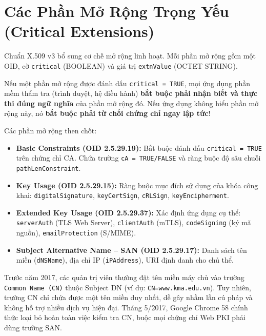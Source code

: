 \section{Các Phần Mở Rộng Trọng Yếu (Critical Extensions)}

Chuẩn X.509 v3 bổ sung cơ chế mở rộng linh hoạt. Mỗi phần mở rộng gồm một OID, cờ \texttt{critical} (BOOLEAN) và giá trị \texttt{extnValue} (OCTET STRING).

\begin{definition}
Nếu một phần mở rộng được đánh dấu \texttt{critical = TRUE}, mọi ứng dụng phần mềm thẩm tra (trình duyệt, hệ điều hành) \textbf{bắt buộc phải nhận biết và thực thi đúng ngữ nghĩa} của phần mở rộng đó. Nếu ứng dụng không hiểu phần mở rộng này, nó \textbf{bắt buộc phải từ chối chứng chỉ ngay lập tức}!
\Enddinhnghia
\end{definition}

Các phần mở rộng then chốt:
\begin{itemize}
  \item \textbf{Basic Constraints (OID 2.5.29.19):} Bắt buộc đánh dấu \texttt{critical = TRUE} trên chứng chỉ CA. Chứa trường \texttt{cA = TRUE/FALSE} và ràng buộc độ sâu chuỗi \texttt{pathLenConstraint}.
  \item \textbf{Key Usage (OID 2.5.29.15):} Ràng buộc mục đích sử dụng của khóa công khai: \texttt{digitalSignature}, \texttt{keyCertSign}, \texttt{cRLSign}, \texttt{keyEncipherment}.
  \item \textbf{Extended Key Usage (OID 2.5.29.37):} Xác định ứng dụng cụ thể: \texttt{serverAuth} (TLS Web Server), \texttt{clientAuth} (mTLS), \texttt{codeSigning} (ký mã nguồn), \texttt{emailProtection} (S/MIME).
  \item \textbf{Subject Alternative Name -- SAN (OID 2.5.29.17):} Danh sách tên miền (\texttt{dNSName}), địa chỉ IP (\texttt{iPAddress}), URI định danh cho chủ thể.
\end{itemize}

\begin{lichsu}
Trước năm 2017, các quản trị viên thường đặt tên miền máy chủ vào trường \texttt{Common Name (CN)} thuộc Subject DN (ví dụ: \texttt{CN=www.kma.edu.vn}). Tuy nhiên, trường CN chỉ chứa được một tên miền duy nhất, dễ gây nhầm lẫn cú pháp và không hỗ trợ nhiều dịch vụ hiện đại. Tháng 5/2017, Google Chrome 58 chính thức loại bỏ hoàn toàn việc kiểm tra CN, buộc mọi chứng chỉ Web PKI phải dùng trường SAN.
\end{lichsu}

